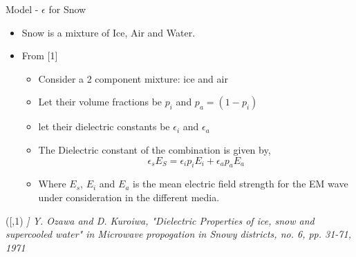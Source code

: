 \documentclass{beamer}
\newenvironment{reference}[2]{%
  \begin{textblock*}{\textwidth}(#1,#2) 
      \footnotesize\it\bgroup\color{red!50!black}}{\egroup\end{textblock*}}
\begin{document}
\begin{frame}{Model - $\epsilon$ for Snow}
\begin{itemize}
  \item Snow is a mixture of Ice, Air and Water.
  \item From [1]
    \begin{itemize}
      \item Consider a 2 component mixture: ice and air
      \item Let their volume fractions be $p_i$ and $p_a=(1-p_i)$
      \item let their dielectric constants be $\epsilon_i$ and $\epsilon_a$
      \item The Dielectric constant of the combination is given by,
        \begin{equation}
          \epsilon_s E_S = \epsilon_i p_i E_i + \epsilon_a p_a E_a
        \end{equation}
      \item Where $E_s$, $E_i$ and $E_a$ is the mean electric field strength for the EM wave under consideration in the different media.
    \end{itemize}
\end{itemize}

\begin{reference}{4mm}{85mm}
  [1] Y. Ozawa and D. Kuroiwa, "Dielectric Properties of ice, snow and supercooled water" in Microwave propogation in Snowy districts, no. 6, pp. 31-71, 1971
\end{reference}

\end{frame}
\end{document}
